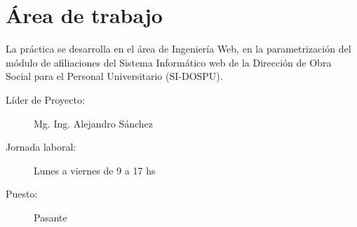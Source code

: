 \section{Área de trabajo}
La práctica se desarrolla en el área de Ingeniería Web, en la parametrización del módulo de afiliaciones del Sistema Informático web de la Dirección de Obra Social para el Personal Universitario (SI-DOSPU).

\begin{description}
    \item [Líder de Proyecto:] Mg. Ing. Alejandro Sánchez 

    \item [Jornada laboral:] Lunes a viernes de 9 a 17 hs

    \item [Puesto:] Pasante









\end{description}